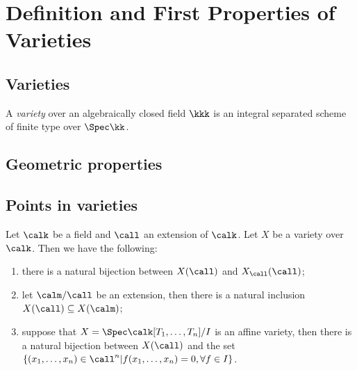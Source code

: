 \section{Definition and First Properties of Varieties}

\subsection{Varieties}

    \begin{definition}\label{def:variety_over_field}
        A \emph{variety} over an algebraically closed field \(\kkk\) is an integral separated scheme of finite type over \(\Spec \kk\).
    \end{definition}



\subsection{Geometric properties}


\subsection{Points in varieties}

    \begin{proposition}\label{prop:points_in_varieties_and_extension_of_base_field}
        Let \(\calk\) be a field and \(\call\) an extension of \(\calk\).
        Let \(X\) be a variety over \(\calk\).
        Then we have the following:
        \begin{enumerate}
            \item there is a natural bijection between \(X(\call)\) and \(X_\call(\call)\);
            \item let \(\calm/\call\) be an extension, then there is a natural inclusion \(X(\call) \subseteq X(\calm)\);
            \item suppose that \(X = \Spec \calk[T_1,\ldots,T_n]/I\) is an affine variety, then there is a natural bijection between \(X(\call)\) and the set \(\{(x_1,\ldots,x_n) \in \call^n | f(x_1,\ldots,x_n) = 0, \forall f \in I\}\).
        \end{enumerate}
    \end{proposition}